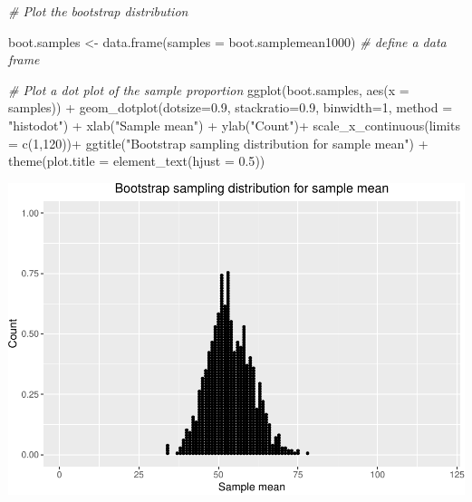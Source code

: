\documentclass[
]{book}
\newenvironment{Shaded}{\begin{snugshade}}{\end{snugshade}}
\newcommand{\AttributeTok}[1]{\textcolor[rgb]{0.77,0.63,0.00}{#1}}
\newcommand{\CommentTok}[1]{\textcolor[rgb]{0.56,0.35,0.01}{\textit{#1}}}
\newcommand{\DecValTok}[1]{\textcolor[rgb]{0.00,0.00,0.81}{#1}}
\newcommand{\FloatTok}[1]{\textcolor[rgb]{0.00,0.00,0.81}{#1}}
\newcommand{\FunctionTok}[1]{\textcolor[rgb]{0.00,0.00,0.00}{#1}}
\newcommand{\NormalTok}[1]{#1}
\newcommand{\OtherTok}[1]{\textcolor[rgb]{0.56,0.35,0.01}{#1}}
\newcommand{\SpecialCharTok}[1]{\textcolor[rgb]{0.00,0.00,0.00}{#1}}
\newcommand{\StringTok}[1]{\textcolor[rgb]{0.31,0.60,0.02}{#1}}
\begin{document}
\begin{Shaded}
\begin{Highlighting}[]
\CommentTok{\# Plot the bootstrap distribution}

\NormalTok{boot.samples }\OtherTok{\textless{}{-}} \FunctionTok{data.frame}\NormalTok{(}\AttributeTok{samples =}\NormalTok{ boot.samplemean1000) }\CommentTok{\# define a data frame}

\CommentTok{\# Plot a dot plot of the sample proportion}
\FunctionTok{ggplot}\NormalTok{(boot.samples, }\FunctionTok{aes}\NormalTok{(}\AttributeTok{x =}\NormalTok{ samples)) }\SpecialCharTok{+}
  \FunctionTok{geom\_dotplot}\NormalTok{(}\AttributeTok{dotsize=}\FloatTok{0.9}\NormalTok{, }\AttributeTok{stackratio=}\FloatTok{0.9}\NormalTok{, }\AttributeTok{binwidth=}\DecValTok{1}\NormalTok{, }\AttributeTok{method =} \StringTok{"histodot"}\NormalTok{) }\SpecialCharTok{+}
  \FunctionTok{xlab}\NormalTok{(}\StringTok{"Sample mean"}\NormalTok{) }\SpecialCharTok{+} \FunctionTok{ylab}\NormalTok{(}\StringTok{"Count"}\NormalTok{)}\SpecialCharTok{+}
  \FunctionTok{scale\_x\_continuous}\NormalTok{(}\AttributeTok{limits =} \FunctionTok{c}\NormalTok{(}\DecValTok{1}\NormalTok{,}\DecValTok{120}\NormalTok{))}\SpecialCharTok{+} 
  \FunctionTok{ggtitle}\NormalTok{(}\StringTok{"Bootstrap sampling distribution for sample mean"}\NormalTok{) }\SpecialCharTok{+}  
  \FunctionTok{theme}\NormalTok{(}\AttributeTok{plot.title =} \FunctionTok{element\_text}\NormalTok{(}\AttributeTok{hjust =} \FloatTok{0.5}\NormalTok{))}
\end{Highlighting}
\end{Shaded}

\includegraphics[width=1\linewidth]{Class_Activity_8_files/figure-latex/unnamed-chunk-7-1}
\end{document}
